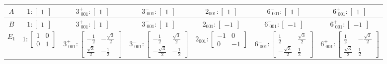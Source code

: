 \documentclass[fleqn,8pt,landscape]{jsarticle}
\begin{document}
\begin{longtable}{ccccccc}
$ A $ & $ 1:\begin{bmatrix} 1 \end{bmatrix} $ & $ 3^{+}_{\,\,001}:\begin{bmatrix} 1 \end{bmatrix} $ & $ 3^{-}_{\,\,001}:\begin{bmatrix} 1 \end{bmatrix} $ & $ 2{}_{001}:\begin{bmatrix} 1 \end{bmatrix} $ & $ 6^{-}_{\,\,001}:\begin{bmatrix} 1 \end{bmatrix} $ & $ 6^{+}_{\,\,001}:\begin{bmatrix} 1 \end{bmatrix} $ \\ \hline
$ B $ & $ 1:\begin{bmatrix} 1 \end{bmatrix} $ & $ 3^{+}_{\,\,001}:\begin{bmatrix} 1 \end{bmatrix} $ & $ 3^{-}_{\,\,001}:\begin{bmatrix} 1 \end{bmatrix} $ & $ 2{}_{001}:\begin{bmatrix} -1 \end{bmatrix} $ & $ 6^{-}_{\,\,001}:\begin{bmatrix} -1 \end{bmatrix} $ & $ 6^{+}_{\,\,001}:\begin{bmatrix} -1 \end{bmatrix} $ \\ \hline
$ E_{1} $ & $ 1:\begin{bmatrix} 1 & 0 \\ 0 & 1 \end{bmatrix} $ & $ 3^{+}_{\,\,001}:\begin{bmatrix} - \frac{1}{2} & - \frac{\sqrt{3}}{2} \\ \frac{\sqrt{3}}{2} & - \frac{1}{2} \end{bmatrix} $ & $ 3^{-}_{\,\,001}:\begin{bmatrix} - \frac{1}{2} & \frac{\sqrt{3}}{2} \\ - \frac{\sqrt{3}}{2} & - \frac{1}{2} \end{bmatrix} $ & $ 2{}_{001}:\begin{bmatrix} -1 & 0 \\ 0 & -1 \end{bmatrix} $ & $ 6^{-}_{\,\,001}:\begin{bmatrix} \frac{1}{2} & \frac{\sqrt{3}}{2} \\ - \frac{\sqrt{3}}{2} & \frac{1}{2} \end{bmatrix} $ & $ 6^{+}_{\,\,001}:\begin{bmatrix} \frac{1}{2} & - \frac{\sqrt{3}}{2} \\ \frac{\sqrt{3}}{2} & \frac{1}{2} \end{bmatrix} $ \\ \hline

\end{longtable}
\end{document}
